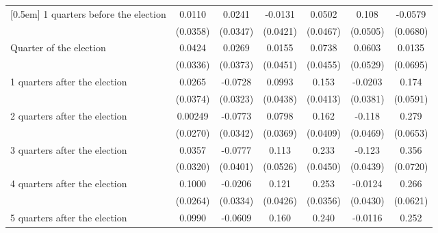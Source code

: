 \begin{table}[!ht]
\begin{tabular}{l*{6}{c}}
[0.5em]
 1 quarters before the election&      0.0110         &      0.0241         &     -0.0131         &      0.0502         &       0.108\sym{*}  &     -0.0579         \\
                    &    (0.0358)         &    (0.0347)         &    (0.0421)         &    (0.0467)         &    (0.0505)         &    (0.0680)         \\
[0.5em]
Quarter of the election&      0.0424         &      0.0269         &      0.0155         &      0.0738         &      0.0603         &      0.0135         \\
                    &    (0.0336)         &    (0.0373)         &    (0.0451)         &    (0.0455)         &    (0.0529)         &    (0.0695)         \\
[0.5em]
 1 quarters after the election&      0.0265         &     -0.0728\sym{*}  &      0.0993\sym{*}  &       0.153\sym{***}&     -0.0203         &       0.174\sym{**} \\
                    &    (0.0374)         &    (0.0323)         &    (0.0438)         &    (0.0413)         &    (0.0381)         &    (0.0591)         \\
[0.5em]
 2 quarters after the election&     0.00249         &     -0.0773\sym{*}  &      0.0798\sym{*}  &       0.162\sym{***}&      -0.118\sym{*}  &       0.279\sym{***}\\
                    &    (0.0270)         &    (0.0342)         &    (0.0369)         &    (0.0409)         &    (0.0469)         &    (0.0653)         \\
[0.5em]
 3 quarters after the election&      0.0357         &     -0.0777         &       0.113\sym{*}  &       0.233\sym{***}&      -0.123\sym{**} &       0.356\sym{***}\\
                    &    (0.0320)         &    (0.0401)         &    (0.0526)         &    (0.0450)         &    (0.0439)         &    (0.0720)         \\
[0.5em]
 4 quarters after the election&      0.1000\sym{***}&     -0.0206         &       0.121\sym{**} &       0.253\sym{***}&     -0.0124         &       0.266\sym{***}\\
                    &    (0.0264)         &    (0.0334)         &    (0.0426)         &    (0.0356)         &    (0.0430)         &    (0.0621)         \\
[0.5em]
 5 quarters after the election&      0.0990\sym{***}&     -0.0609         &       0.160\sym{***}&       0.240\sym{***}&     -0.0116         &       0.252\sym{***}\\

\end{tabular}
\end{table}
